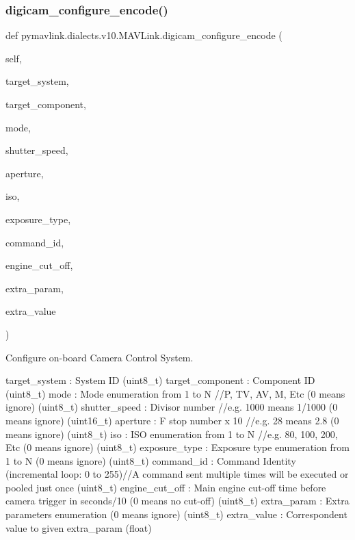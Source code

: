 \begin{DoxyVerb}
\begin{DoxyVerb}
\subsubsection{\texorpdfstring{digicam\+\_\+configure\+\_\+encode()}{digicam\_configure\_encode()}}
{\footnotesize\ttfamily def pymavlink.\+dialects.\+v10.\+M\+A\+V\+Link.\+digicam\+\_\+configure\+\_\+encode (\begin{DoxyParamCaption}\item[{}]{self,  }\item[{}]{target\+\_\+system,  }\item[{}]{target\+\_\+component,  }\item[{}]{mode,  }\item[{}]{shutter\+\_\+speed,  }\item[{}]{aperture,  }\item[{}]{iso,  }\item[{}]{exposure\+\_\+type,  }\item[{}]{command\+\_\+id,  }\item[{}]{engine\+\_\+cut\+\_\+off,  }\item[{}]{extra\+\_\+param,  }\item[{}]{extra\+\_\+value }\end{DoxyParamCaption})}

\begin{DoxyVerb}Configure on-board Camera Control System.

target_system             : System ID (uint8_t)
target_component          : Component ID (uint8_t)
mode                      : Mode enumeration from 1 to N //P, TV, AV, M, Etc (0 means ignore) (uint8_t)
shutter_speed             : Divisor number //e.g. 1000 means 1/1000 (0 means ignore) (uint16_t)
aperture                  : F stop number x 10 //e.g. 28 means 2.8 (0 means ignore) (uint8_t)
iso                       : ISO enumeration from 1 to N //e.g. 80, 100, 200, Etc (0 means ignore) (uint8_t)
exposure_type             : Exposure type enumeration from 1 to N (0 means ignore) (uint8_t)
command_id                : Command Identity (incremental loop: 0 to 255)//A command sent multiple times will be executed or pooled just once (uint8_t)
engine_cut_off            : Main engine cut-off time before camera trigger in seconds/10 (0 means no cut-off) (uint8_t)
extra_param               : Extra parameters enumeration (0 means ignore) (uint8_t)
extra_value               : Correspondent value to given extra_param (float)\end{DoxyVerb}
 \mbox{\label{classpymavlink_1_1dialects_1_1v10_1_1MAVLink_a3ba3dfb2f4c4024d158aad86dd6153ac}} 

\end{DoxyVerb}
\end{DoxyVerb}

